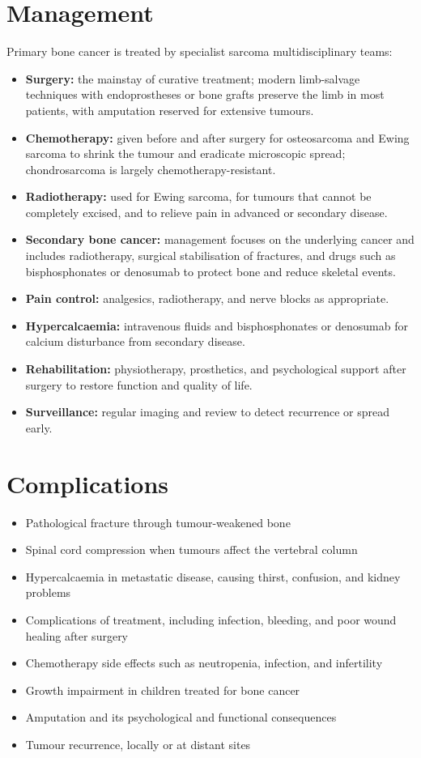 \section*{Management}
Primary bone cancer is treated by specialist sarcoma multidisciplinary teams:
\begin{itemize}
    \item \textbf{Surgery:} the mainstay of curative treatment; modern limb-salvage techniques with endoprostheses or bone grafts preserve the limb in most patients, with amputation reserved for extensive tumours.
    \item \textbf{Chemotherapy:} given before and after surgery for osteosarcoma and Ewing sarcoma to shrink the tumour and eradicate microscopic spread; chondrosarcoma is largely chemotherapy-resistant.
    \item \textbf{Radiotherapy:} used for Ewing sarcoma, for tumours that cannot be completely excised, and to relieve pain in advanced or secondary disease.
    \item \textbf{Secondary bone cancer:} management focuses on the underlying cancer and includes radiotherapy, surgical stabilisation of fractures, and drugs such as bisphosphonates or denosumab to protect bone and reduce skeletal events.
    \item \textbf{Pain control:} analgesics, radiotherapy, and nerve blocks as appropriate.
    \item \textbf{Hypercalcaemia:} intravenous fluids and bisphosphonates or denosumab for calcium disturbance from secondary disease.
    \item \textbf{Rehabilitation:} physiotherapy, prosthetics, and psychological support after surgery to restore function and quality of life.
    \item \textbf{Surveillance:} regular imaging and review to detect recurrence or spread early.
\end{itemize}

\section*{Complications}
\begin{itemize}
    \item Pathological fracture through tumour-weakened bone
    \item Spinal cord compression when tumours affect the vertebral column
    \item Hypercalcaemia in metastatic disease, causing thirst, confusion, and kidney problems
    \item Complications of treatment, including infection, bleeding, and poor wound healing after surgery
    \item Chemotherapy side effects such as neutropenia, infection, and infertility
    \item Growth impairment in children treated for bone cancer
    \item Amputation and its psychological and functional consequences
    \item Tumour recurrence, locally or at distant sites
\end{itemize}

